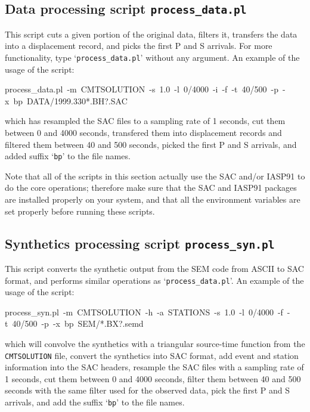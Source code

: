 \subsection{Data processing script \texttt{process\_data.pl}}

This script cuts a given portion of the original data, filters it,
transfers the data into a displacement record, and picks the first
P and S arrivals. For more functionality, type `\texttt{process\_data.pl}'
without any argument. An example of the usage of the script:
\begin{lyxcode}
{\footnotesize process\_data.pl~-m~CMTSOLUTION~-s~1.0~-l~0/4000~-i~-f~-t~40/500~-p~-x~bp~DATA/1999.330{*}.BH?.SAC}~
\end{lyxcode}
\noindent which has resampled the SAC files to a sampling rate of
1 seconds, cut them between 0 and 4000 seconds, transfered them into
displacement records and filtered them between 40 and 500 seconds,
picked the first P and S arrivals, and added suffix `\texttt{bp}'
to the file names.

Note that all of the scripts in this section actually use the SAC
and/or IASP91 to do the core operations; therefore make sure that
the SAC and IASP91 packages are installed properly on your system,
and that all the environment variables are set properly before running
these scripts.


\subsection{Synthetics processing script \texttt{process\_syn.pl}}

This script converts the synthetic output from the SEM code from ASCII
to SAC format, and performs similar operations as `\texttt{process\_data.pl}'.
An example of the usage of the script:
\begin{lyxcode}
{\footnotesize process\_syn.pl~-m~CMTSOLUTION~-h~-a~STATIONS~-s~1.0~-l~0/4000~-f~-t~40/500~-p~-x~bp~SEM/{*}.BX?.semd}~
\end{lyxcode}
which will convolve the synthetics with a triangular source-time function
from the \texttt{CMTSOLUTION} file, convert the synthetics into SAC
format, add event and station information into the SAC headers, resample
the SAC files with a sampling rate of 1 seconds, cut them between
0 and 4000 seconds, filter them between 40 and 500 seconds with the
same filter used for the observed data, pick the first P and S arrivals,
and add the suffix `\texttt{bp}' to the file names.

